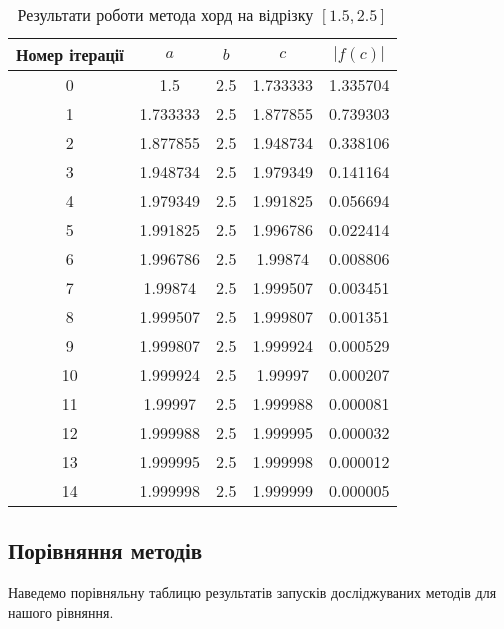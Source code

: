 \begin{table}[h!]
    \centering
    \begin{tabular}{|c|c|c|c|c|}
        \hline
        \textbf{Номер ітерації} & $a$ & $b$ & $c$ & $|f(c)|$ \\
        \hline
        0 & 1.5 & 2.5 & 1.733333 & 1.335704 \\
        \hline
        1 & 1.733333 & 2.5 & 1.877855 & 0.739303 \\
        \hline
        2 & 1.877855 & 2.5 & 1.948734 & 0.338106 \\
        \hline
        3 & 1.948734 & 2.5 & 1.979349 & 0.141164 \\
        \hline
        4 & 1.979349 & 2.5 & 1.991825 & 0.056694 \\
        \hline
        5 & 1.991825 & 2.5 & 1.996786 & 0.022414 \\
        \hline
        6 & 1.996786 & 2.5 & 1.99874 & 0.008806 \\
        \hline
        7 & 1.99874 & 2.5 & 1.999507 & 0.003451 \\
        \hline
        8 & 1.999507 & 2.5 & 1.999807 & 0.001351 \\
        \hline
        9 & 1.999807 & 2.5 & 1.999924 & 0.000529 \\
        \hline
        10 & 1.999924 & 2.5 & 1.99997 & 0.000207 \\
        \hline
        11 & 1.99997 & 2.5 & 1.999988 & 0.000081 \\
        \hline
        12 & 1.999988 & 2.5 & 1.999995 & 0.000032\\
        \hline
        13 & 1.999995 & 2.5 & 1.999998 & 0.000012 \\
        \hline
        14 & 1.999998 & 2.5 & 1.999999 & 0.000005 \\
        \hline
    \end{tabular}
    \caption{Результати роботи метода хорд на відрізку $[1.5, 2.5]$}
\end{table}

\pagebreak
\subsection*{Порівняння методів}

Наведемо порівняльну таблицю результатів запусків
досліджуваних методів для нашого рівняння.

